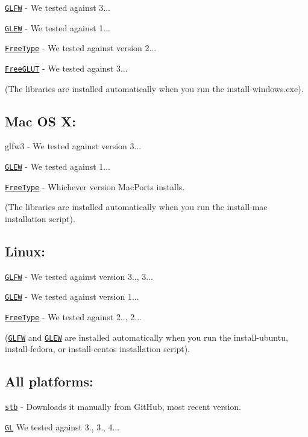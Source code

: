 \href{https://github.com/glfw/glfw/releases/download/3.1.1/glfw-3.1.1.zip}{\tt G\-L\-F\-W} -\/ We tested against 3...

\href{http://downloads.sourceforge.net/project/glew/glew/1.12.0/glew-1.12.0.zip}{\tt G\-L\-E\-W} -\/ We tested against 1...

\href{http://downloads.sourceforge.net/project/gnuwin32/freetype/2.3.5-1/freetype-2.3.5-1-bin.zip}{\tt Free\-Type} -\/ We tested against version 2...

\href{http://downloads.sourceforge.net/project/freeglut/freeglut/3.0.0/freeglut-3.0.0.tar.gz}{\tt Free\-G\-L\-U\-T} -\/ We tested against 3...

(The libraries are installed automatically when you run the install-\/windows.\-exe).

\subsection*{Mac O\-S X\-:}

glfw3 -\/ We tested against version 3...

\href{http://downloads.sourceforge.net/project/glew/glew/1.12.0/glew-1.12.0.zip}{\tt G\-L\-E\-W} -\/ We tested against 1...

\href{http://downloads.sourceforge.net/project/gnuwin32/freetype/2.3.5-1/freetype-2.3.5-1-bin.zip}{\tt Free\-Type} -\/ Whichever version Mac\-Ports installs.

(The libraries are installed automatically when you run the install-\/mac installation script).

\subsection*{Linux\-:}

\href{http://www.glfw.org/download.html}{\tt G\-L\-F\-W} -\/ We tested against version 3.., 3...

\href{http://glew.sourceforge.net/}{\tt G\-L\-E\-W} -\/ We tested against version 1...

\href{http://www.freetype.org/download.html}{\tt Free\-Type} -\/ We tested against 2.., 2...

(\href{http://www.glfw.org/download.html}{\tt G\-L\-F\-W} and \href{http://downloads.sourceforge.net/project/glew/glew/1.12.0/glew-1.12.0.zip}{\tt G\-L\-E\-W} are installed automatically when you run the install-\/ubuntu, install-\/fedora, or install-\/centos installation script).

\subsection*{All platforms\-:}

\href{https://github.com/nothings/stb/archive/master.zip}{\tt stb} -\/ Downloads it manually from Git\-Hub, most recent version.

\href{https://www.opengl.org/}{\tt G\-L} We tested against 3., 3., 4... 